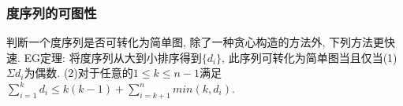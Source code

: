 \subsubsection{度序列的可图性}
\noindent
判断一个度序列是否可转化为简单图, 除了一种贪心构造的方法外, 下列方法更快速.
EG定理: 将度序列从大到小排序得到$\{d_i\}$, 此序列可转化为简单图当且仅当(1)$\Sigma d_i$为偶数. (2)对于任意的$1\le k \le n-1$满足$\sum_{i=1}^{k} d_i \le k(k-1)+\sum_{i=k+1}^n min(k, d_i)$.
